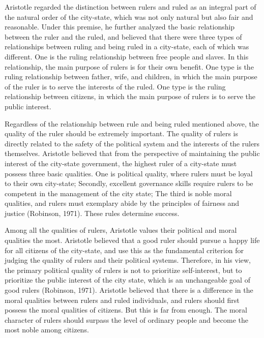 \documentclass[11pt]{article}
\begin{document}
Aristotle regarded the distinction between rulers and ruled as an integral part of the natural order of the city-state, which was not only natural but also fair and reasonable. Under this premise, he further analyzed the basic relationship between the ruler and the ruled, and believed that there were three types of relationships between ruling and being ruled in a city-state, each of which was different. One is the ruling relationship between free people and slaves. In this relationship, the main purpose of rulers is for their own benefit. One type is the ruling relationship between father, wife, and children, in which the main purpose of the ruler is to serve the interests of the ruled. One type is the ruling relationship between citizens, in which the main purpose of rulers is to serve the public interest.

Regardless of the relationship between rule and being ruled mentioned above, the quality of the ruler should be extremely important. The quality of rulers is directly related to the safety of the political system and the interests of the rulers themselves. Aristotle believed that from the perspective of maintaining the public interest of the city-state government, the highest ruler of a city-state must possess three basic qualities. One is political quality, where rulers must be loyal to their own city-state; Secondly, excellent governance skills require rulers to be competent in the management of the city state; The third is noble moral qualities, and rulers must exemplary abide by the principles of fairness and justice (Robinson, 1971). These rules determine success.

Among all the qualities of rulers, Aristotle values their political and moral qualities the most. Aristotle believed that a good ruler should pursue a happy life for all citizens of the city-state, and use this as the fundamental criterion for judging the quality of rulers and their political systems. Therefore, in his view, the primary political quality of rulers is not to prioritize self-interest, but to prioritize the public interest of the city state, which is an unchangeable goal of good rulers (Robinson, 1971). Aristotle believed that there is a difference in the moral qualities between rulers and ruled individuals, and rulers should first possess the moral qualities of citizens. But this is far from enough. The moral character of rulers should surpass the level of ordinary people and become the most noble among citizens.
\end{document}

